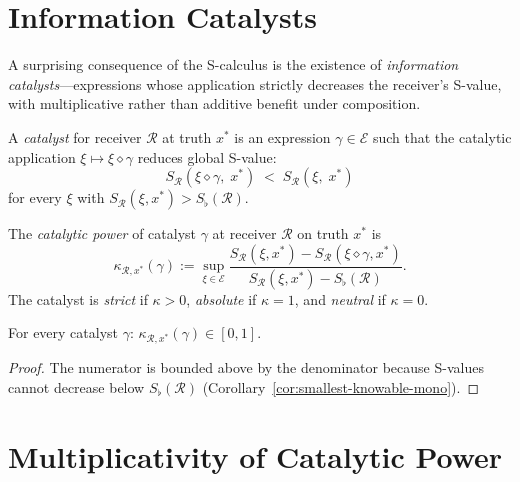 \section{Information Catalysts}
\label{sec:ch14-catalysts}

A surprising consequence of the S-calculus is the existence of
\emph{information catalysts}---expressions whose application strictly decreases
the receiver's S-value, with multiplicative rather than additive benefit under
composition.

\begin{definition}[Catalyst]\label{def:catalyst-mono}
A \emph{catalyst} for receiver $\mathcal{R}$ at truth $x^{*}$ is an expression
$\gamma \in \mathcal{E}$ such that the catalytic application
$\xi \mapsto \xi \diamond \gamma$ reduces global S-value:
\[
  S_{\mathcal{R}}(\xi \diamond \gamma,\; x^{*})
  \;<\; S_{\mathcal{R}}(\xi,\; x^{*})
\]
for every $\xi$ with $S_{\mathcal{R}}(\xi, x^{*}) > S_{\flat}(\mathcal{R})$.
\end{definition}

\begin{definition}\label{def:catpower-mono}
The \emph{catalytic power} of catalyst $\gamma$ at receiver $\mathcal{R}$ on
truth $x^{*}$ is
\[
  \kappa_{\mathcal{R}, x^{*}}(\gamma)
  := \sup_{\xi \in \mathcal{E}}
  \frac{S_{\mathcal{R}}(\xi, x^{*})
        - S_{\mathcal{R}}(\xi \diamond \gamma, x^{*})}
       {S_{\mathcal{R}}(\xi, x^{*}) - S_{\flat}(\mathcal{R})}.
\]
The catalyst is \emph{strict} if $\kappa > 0$, \emph{absolute} if $\kappa = 1$,
and \emph{neutral} if $\kappa = 0$.
\end{definition}

\begin{lemma}\label{lem:cat-power-range-mono}
For every catalyst $\gamma$:
$\kappa_{\mathcal{R}, x^{*}}(\gamma) \in [0,1]$.
\end{lemma}

\begin{proof}
The numerator is bounded above by the denominator because S-values cannot
decrease below $S_{\flat}(\mathcal{R})$ (Corollary~\ref{cor:smallest-knowable-mono}).
\end{proof}

\section{Multiplicativity of Catalytic Power}
\label{sec:ch14-multiplicativity}

